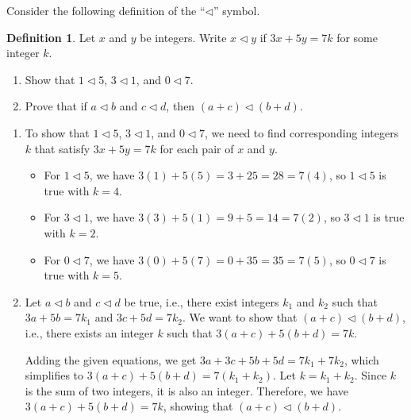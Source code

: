 \documentclass{article}
\theoremstyle{definition}
\newtheorem*{definition}{Definition}
\begin{document}
\begin{question}
    Consider the following definition of the ``$\triangleleft$'' symbol.
	\begin{definition}
	 Let $x$ and $y$ be integers. Write $x\triangleleft y$ if $3x+5y=7k$ for some integer $k$.
	\end{definition}
        \begin{enumerate}
           \item Show that $1\triangleleft 5$, $3\triangleleft 1$, and $0\triangleleft 7$.
           \item Prove that if $a\triangleleft b$ and $c\triangleleft d$, then $(a+c) \triangleleft (b+d)$.
        \end{enumerate}
\end{question}
\begin{solution}%
    \begin{enumerate}
        \item To show that $1 \triangleleft 5$, $3 \triangleleft 1$, and $0 \triangleleft 7$, we need to find corresponding integers $k$ that satisfy $3x + 5y = 7k$ for each pair of $x$ and $y$.
        \begin{itemize}
            \item For $1 \triangleleft 5$, we have $3(1) + 5(5) = 3 + 25 = 28 = 7(4)$, so $1 \triangleleft 5$ is true with $k = 4$.
            \item For $3 \triangleleft 1$, we have $3(3) + 5(1) = 9 + 5 = 14 = 7(2)$, so $3 \triangleleft 1$ is true with $k = 2$.
            \item For $0 \triangleleft 7$, we have $3(0) + 5(7) = 0 + 35 = 35 = 7(5)$, so $0 \triangleleft 7$ is true with $k = 5$.
        \end{itemize}
        
        \item Let $a\triangleleft b$ and $c\triangleleft d$ be true, i.e., there exist integers $k_1$ and $k_2$ such that $3a+5b=7k_1$ and $3c+5d=7k_2$.
        We want to show that $(a+c) \triangleleft (b+d)$, i.e., there exists an integer $k$ such that $3(a+c) + 5(b+d) = 7k$.
        
        Adding the given equations, we get $3a+3c+5b+5d = 7k_1 + 7k_2$, which simplifies to $3(a+c) + 5(b+d) = 7(k_1+k_2)$.
        Let $k = k_1 + k_2$. Since $k$ is the sum of two integers, it is also an integer. Therefore, we have $3(a+c) + 5(b+d) = 7k$, showing that $(a+c) \triangleleft (b+d)$.
    \end{enumerate}
\end{solution}
\end{document}
